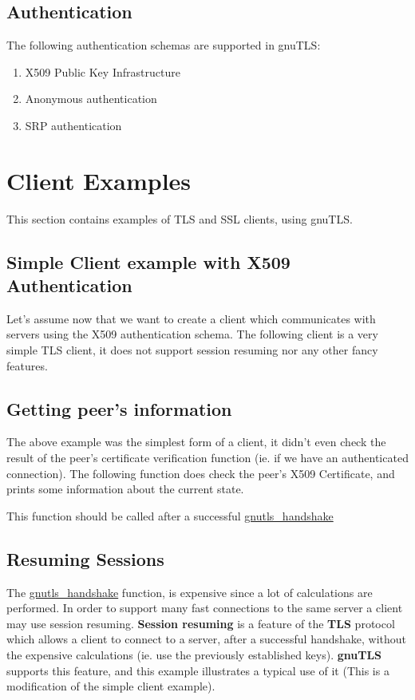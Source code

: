 \documentclass{article}
\begin{document}
\subsection{Authentication}
\par
The following authentication schemas are supported in gnuTLS:
\begin{enumerate}
 \item X509 Public Key Infrastructure
 \item Anonymous authentication
 \item SRP authentication
\end{enumerate}



\section{Client Examples}
This section contains examples of TLS and SSL clients, using gnuTLS. 

\subsection{Simple Client example with X509 Authentication}
Let's assume now that we want to create a client which communicates
with servers using the X509 authentication schema. The following client
is a very simple TLS client, it does not support session resuming nor
any other fancy features.


\subsection{Getting peer's information}
\par The above example was the simplest form of a client, it didn't even check
the result of the peer's certificate verification function (ie. if we have
an authenticated connection). The following function does check the peer's X509
Certificate, and prints some information about the current state.
\par
This function should be called after a successful
\hyperref{gnutls\_handshake()}{gnutls\_handshake() (see Section }{ for more information)}{gnutls_handshake}



\subsection{Resuming Sessions}
\par
The 
\hyperref{gnutls\_handshake()}{gnutls\_handshake() (see Section }{ for more information)}{gnutls_handshake}
 function, is expensive since
a lot of calculations are performed. In order to support many fast connections to
the same server a client may use session resuming. {\bf Session resuming} is a
feature of the {\bf TLS} protocol which allows a client to connect to a server,
after a successful handshake, without the expensive calculations (ie. use the previously
established keys). {\bf gnuTLS} supports this feature, and this example illustrates a
typical use of it (This is a modification of the simple client example).
\end{document}
